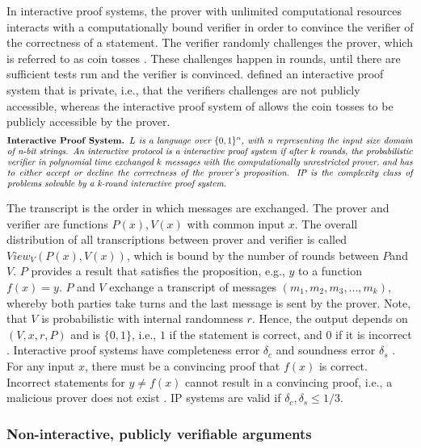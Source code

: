 In interactive proof systems, the prover with unlimited computational resources interacts with a computationally bound verifier in order to convince the verifier of the correctness of a statement. The verifier randomly challenges the prover, which is referred to as coin tosses \citep{GoldwasserCoinTosses}. These challenges happen in rounds, until there are sufficient tests run and the verifier is convinced. \citet{GoldwasserIPs} defined an interactive proof system that is private, i.e., that the verifiers challenges are not publicly accessible, whereas the interactive proof system of \citet{BabaiIPs} allows the coin tosses to be publicly accessible by the prover.
\begin{align*}
    \text{\parbox{450pt}{\textbf{Interactive Proof System.} \textit{\(L\) is a language over \(\{0,1\}^n\), with n representing the input size domain of n-bit strings. An interactive protocol is a interactive proof system if after \(k\) rounds, the probabilistic verifier in polynomial time exchanged \(k\) messages with the computationally unrestricted prover, and has to either accept or decline the correctness of the prover's proposition. IP is the complexity class of problems solvable by a k-round interactive proof system.}}}
\end{align*}
  
The transcript is the order in which messages are exchanged. The prover and verifier are functions \(P(x), V(x)\) with common input \(x\). The overall distribution of all transcriptions between prover and verifier is called \(View_V(P(x), V(x))\), which is bound by the number of rounds between \(P\)and \(V\). \(P\) provides a result that satisfies the proposition, e.g., \(y\) to a function \(f(x) = y\). \(P\) and \(V\) exchange a transcript of messages \((m_1, m_2, m_3, ..., m_k)\), whereby both parties take turns and the last message is sent by the prover. Note, that \(V\) is probabilistic with internal randomness \(r\). Hence, the output depends on \((V, x, r, P)\) and is \(\{0,1\}\), i.e., \(1\) if the statement is correct, and \(0\) if it is incorrect \citep{GoldwasserIPs, BabaiIPs}. Interactive proof systems have completeness error \(\delta_c\) and soundness error \(\delta_s\) . For any input \(x\), there must be a convincing proof that \(f(x)\) is correct. Incorrect statements for \(y \neq f(x)\) cannot result in a convincing proof, i.e., a malicious prover does not exist \citep{Thaler}. IP systems are valid if \(\delta_c, \delta_s \leq 1/3\).

\subsubsection{Non-interactive, publicly verifiable arguments}
